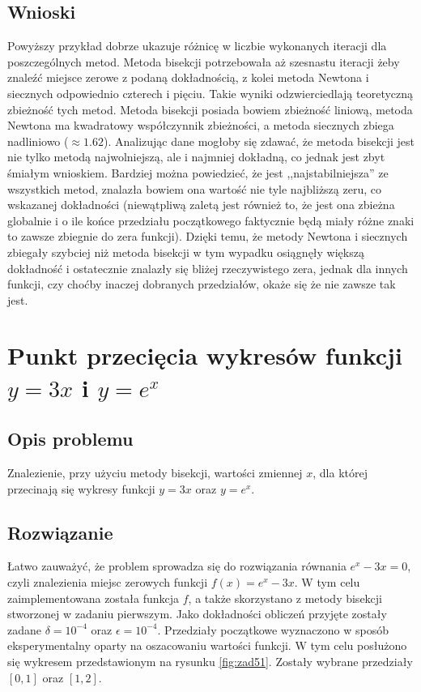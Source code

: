 \documentclass[11pt]{mk-polish-lab-report}
\begin{document}
\subsection{Wnioski}
Powyższy przykład dobrze ukazuje różnicę w liczbie wykonanych iteracji dla poszczególnych metod. Metoda bisekcji potrzebowała aż szesnastu iteracji żeby znaleźć miejsce zerowe z podaną dokładnością, z kolei metoda Newtona i siecznych odpowiednio czterech i pięciu. Takie wyniki odzwierciedlają teoretyczną zbieżność tych metod. Metoda bisekcji posiada bowiem zbieżność liniową, metoda Newtona ma kwadratowy współczynnik zbieżności, a metoda siecznych zbiega nadliniowo ($\approx 1.62$). Analizując dane mogłoby się zdawać, że metoda bisekcji jest nie tylko metodą najwolniejszą, ale i najmniej dokładną, co jednak jest zbyt śmiałym wnioskiem. Bardziej można powiedzieć, że jest ,,najstabilniejsza'' ze wszystkich metod, znalazła bowiem ona wartość nie tyle najbliższą zeru, co wskazanej dokładności (niewątpliwą zaletą jest również to, że jest ona zbieżna globalnie i o ile końce przedziału początkowego faktycznie będą miały różne znaki to zawsze zbiegnie do zera funkcji). Dzięki temu, że metody Newtona i siecznych zbiegały szybciej niż metoda bisekcji w tym wypadku osiągnęły większą dokładność i ostatecznie znalazły się bliżej rzeczywistego zera, jednak dla innych funkcji, czy choćby inaczej dobranych przedziałów, okaże się że nie zawsze tak jest.

\section{Punkt przecięcia wykresów funkcji $y = 3x$ i $y = e^x$}

\subsection{Opis problemu}
Znalezienie, przy użyciu metody bisekcji, wartości zmiennej $x$, dla której przecinają się wykresy funkcji $y=3x$ oraz $y=e^x$.

\subsection{Rozwiązanie}
Łatwo zauważyć, że problem sprowadza się do rozwiązania równania $e^x - 3x = 0$, czyli znalezienia miejsc zerowych funkcji $f(x) = e^x - 3x$. W tym celu zaimplementowana została funkcja $f$, a także skorzystano z metody bisekcji stworzonej w zadaniu pierwszym. Jako dokładności obliczeń przyjęte zostały zadane $\delta = 10^{-4}$ oraz $\epsilon = 10^{-4}$. Przedziały początkowe wyznaczono w sposób eksperymentalny oparty na oszacowaniu wartości funkcji. W tym celu posłużono się wykresem przedstawionym na rysunku \ref{fig:zad51}. Zostały wybrane przedziały $[0, 1]$ oraz $[1, 2]$.
\end{document}
